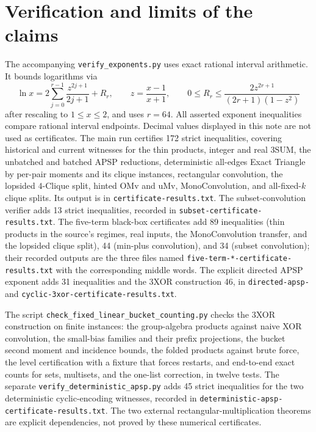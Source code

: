 \documentclass[11pt]{article}
\begin{document}
\section{Verification and limits of the claims}
The accompanying \texttt{verify\_exponents.py} uses exact rational interval
arithmetic. It bounds logarithms via
\[
\ln x=2\sum_{j=0}^{r-1}\frac{z^{2j+1}}{2j+1}+R_r,
\qquad z=\frac{x-1}{x+1},\qquad
0\le R_r\le\frac{2z^{2r+1}}{(2r+1)(1-z^2)}
\]
after rescaling to $1\le x\le2$, and uses $r=64$. All asserted exponent
inequalities compare rational interval endpoints. Decimal values displayed
in this note are not used as certificates. The main run certifies 172 strict
inequalities, covering historical and current witnesses for the thin
products, integer and real 3SUM, the unbatched and batched APSP reductions,
deterministic all-edges Exact Triangle by per-pair moments and its clique
instances, rectangular
convolution, the lopsided $4$-Clique split, hinted OMv and uMv,
MonoConvolution, and all-fixed-$k$ clique splits. Its output is in
\texttt{certificate-results.txt}. The subset-convolution verifier adds
13 strict inequalities, recorded in \texttt{subset-certificate-results.txt}.
The five-term black-box certificates add 89 inequalities (thin products in
the source's regimes, real inputs, the MonoConvolution transfer, and the
lopsided clique split), 44 (min-plus convolution), and 34 (subset
convolution); their recorded outputs are the three files named
\texttt{five-term-*-certificate-results.txt} with the corresponding
middle words.
The explicit directed APSP exponent adds 31 inequalities and the 3XOR
construction 46, in \texttt{directed-apsp-} and
\texttt{cyclic-3xor-\allowbreak certificate-\allowbreak results.txt}.

The script
\texttt{check\_fixed\_\allowbreak linear\_\allowbreak bucket\_\allowbreak counting.py}
checks the 3XOR construction on finite instances: the group-algebra
products against naive XOR convolution, the small-bias families and their
prefix projections, the bucket second moment and incidence bounds, the
folded products against brute force, the level certification with a fixture
that forces restarts, and end-to-end exact counts for sets, multisets, and
the one-list correction, in twelve tests.
The separate \texttt{verify\_deterministic\_apsp.py} adds 45 strict
inequalities for the two deterministic cyclic-encoding witnesses, recorded
in \texttt{deterministic-apsp-\allowbreak certificate-\allowbreak results.txt}. The two external
rectangular-multiplication theorems are explicit dependencies, not proved
by these numerical certificates.
\end{document}
